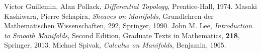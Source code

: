 \begin{thebibliography}{20} 
     Victor Guillemin, Alan Pollack, 
    \textit{Differential Topology}, 
    Prentice-Hall, 1974.
     Masaki Kashiwara, Pierre Schapira, 
    \textit{Sheaves on Manifolds}, 
    Grundlehren der Mathematischen Wissenschaften, 292, Springer, 1990.
     John M. Lee, 
    \textit{Introduction to Smooth Manifolds}, Second Edition,
    Graduate Texts in Mathematics, \textbf{218}, Springer, 2013.
     Michael Spivak, 
    \textit{Calculus on Manifolds}, 
    Benjamin, 1965.
\end{thebibliography}




